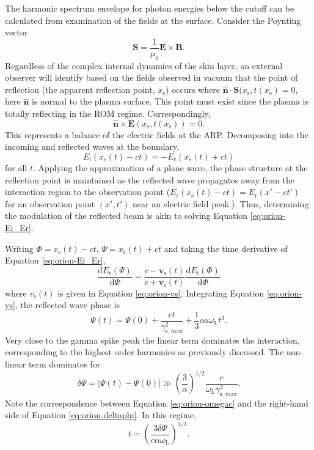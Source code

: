 The harmonic spectrum envelope for photon energies below the cutoff can be calculated from examination of the fields at the surface. 
Consider the Poynting vector
\begin{equation}
	\mathbf{S} = \frac{1}{\mu_0}\mathbf{E}\times\mathbf{B}.
\end{equation}
Regardless of the complex internal dynamics of the skin layer, an external observer will identify based on the fields observed in vacuum that the point of reflection (the apparent reflection point, $x_\mathrm{s}$) occurs where $\hat{\mathbf{n}}\cdot\mathbf{S}(x_\mathrm{s},t(x_\mathrm{s}) = 0$, here $\hat{\mathbf{n}}$ is normal to the plasma surface. This point must exist since the plasma is totally reflecting in the ROM regime. Correspondingly,
\begin{equation}
	\hat{\mathbf{n}}\times \mathbf{E}(x_\mathrm{s},t(x_\mathrm{s})) = 0.
\end{equation}
This represents a balance of the electric fields at the ARP. Decomposing into the incoming and reflected waves at the boundary,
\begin{equation}\label{eq:orion-Ei_Er}
	E_\mathrm{i}(x_\mathrm{s}(t) - ct) = - E_\mathrm{r}(x_\mathrm{s}(t) + ct)
\end{equation}
for all $t$. Applying the approximation of a plane wave, the phase structure at the reflection point is maintained as the reflected wave propagates away from the interaction region to the observation point ($E_\mathrm{r}(x_\mathrm{s}(t) - ct) = E_\mathrm{r}(x' - ct')$ for an observation point $(x',t')$ near an electric field peak.). Thus, determining the modulation of the reflected beam is akin to solving Equation \ref{eq:orion-Ei_Er}. 

Writing $\Phi = x_\mathrm{s}(t) - ct$, $\Psi = x_\mathrm{s}(t) + ct$ and taking the time derivative of Equation \ref{eq:orion-Ei_Er},
\begin{equation}
	\frac{\mathrm{d}E_\mathrm{r}(\Psi)}{\mathrm{d}\Psi} = \frac{c - \mathbf{v}_\mathrm{s}(t)}{c+\mathbf{v}_\mathrm{s}(t)}\frac{\mathrm{d}E_\mathrm{i}(\Phi)}{\mathrm{d}\Phi}
\end{equation}
where $v_\mathrm{s}(t)$ is given in Equation \ref{eq:orion-vs}. Integrating Equation \ref{eq:orion-vs}, the reflected wave phase is
\begin{equation}
	\Psi(t) = \Psi(0) + \frac{ct}{\gamma_\mathrm{s,\, max}^2} + \frac{1}{3}c\alpha \omega_\mathrm{L}t^3.
\end{equation}
Very close to the gamma spike peak the linear term dominates the interaction, corresponding to the highest order harmonics as previously discussed. The non-linear term dominates for 
\begin{equation}\label{eq:orion-deltaphi}
	\delta \Psi = |\Psi(t) - \Psi(0)| \gg \left(\frac{3}{\alpha}\right)^{1/2}\frac{c}{\omega_\mathrm{L}\gamma_\mathrm{s,\, max}^3}.
\end{equation}
Note the correspondence between Equation \ref{eq:orion-omegac} and the right-hand side of Equation \ref{eq:orion-deltaphi}. In this regime,
\begin{equation}
	t = \left(\frac{3\delta \Psi }{c\alpha \omega_\mathrm{L}}\right)^{1/3}.
\end{equation}

